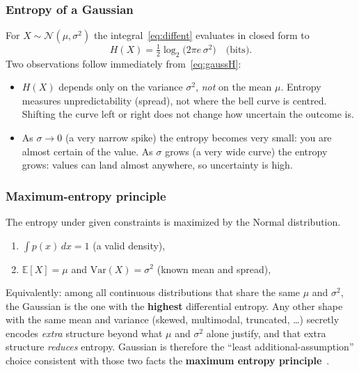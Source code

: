 \documentclass[12pt,a4paper]{article}
\begin{document}
\subsubsection*{Entropy of a Gaussian}

For \(X\sim\mathcal{N}(\mu,\sigma^2)\) the integral~\eqref{eq:diffent}
evaluates in closed form to
\begin{equation}
  H(X) = \tfrac{1}{2}\log_2\!\bigl(2\pi e\,\sigma^2\bigr)
  \quad\text{(bits)}.
  \label{eq:gaussH}
\end{equation}
Two observations follow immediately from~\eqref{eq:gaussH}:
\begin{itemize}
  \item \(H(X)\) depends only on the variance \(\sigma^2\), \emph{not} on the
        mean \(\mu\). Entropy measures unpredictability (spread), not where
        the bell curve is centred. Shifting the curve left or right does not
        change how uncertain the outcome is.
  \item As \(\sigma\to 0\) (a very narrow spike) the entropy becomes very
        small: you are almost certain of the value. As \(\sigma\) grows
        (a very wide curve) the entropy grows: values can land almost
        anywhere, so uncertainty is high.
\end{itemize}

\subsubsection*{Maximum-entropy principle}

The entropy under given constraints is maximized by the Normal distribution.
\begin{enumerate}
  \item \(\displaystyle\int p(x)\,dx = 1\) (a valid density),
  \item \(\displaystyle\mathbb{E}[X]=\mu\) and
        \(\displaystyle\mathrm{Var}(X)=\sigma^2\) (known mean and spread),
\end{enumerate}
Equivalently: among all continuous
distributions that share the same \(\mu\) and \(\sigma^2\), the Gaussian
is the one with the \textbf{highest} differential entropy. Any other shape
with the same mean and variance (skewed, multimodal, truncated, \ldots)
secretly encodes \emph{extra} structure beyond what \(\mu\) and \(\sigma^2\)
alone justify, and that extra structure \emph{reduces} entropy. 
Gaussian is therefore the ``least additional-assumption'' choice consistent
with those two facts the \textbf{maximum entropy principle}~\cite{Blahut2002}.
\end{document}
